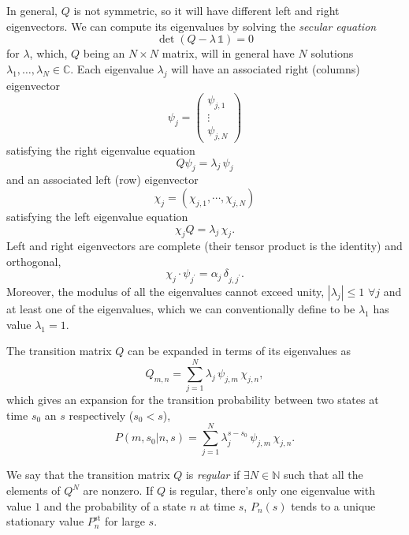 \documentclass[12pt]{article}
\numberwithin{equation}{section} %
\begin{document}
In general, $Q$ is not symmetric, so it will have different left and right eigenvectors. We can compute its eigenvalues by solving the \textit{secular equation}
\begin{equation}
\det\left( Q - \lambda\,\mathbb{1}\right) = 0
\end{equation}
for $\lambda$, which, $Q$ being an $N\times N$ matrix, will in general have $N$ solutions $\lambda_1, \ldots, \lambda_N \in\mathbb{C}$. Each eigenvalue $\lambda_j$ will have an associated right (columns) eigenvector
\begin{equation*}
\psi_j = \left(\begin{array}{c}
\psi_{j,1} \\
\vdots \\
\psi_{j,N}
\end{array}\right)
\end{equation*}
satisfying the right eigenvalue equation
\begin{equation}
Q \psi_j = \lambda_j\,\psi_j
\end{equation}
and an associated left (row) eigenvector
\begin{equation*}
\chi_j = \left( \chi_{j,1}, \cdots, \chi_{j,N}\right)
\end{equation*}
satisfying the left eigenvalue equation
\begin{equation}
\chi_j Q = \lambda_j\,\chi_j.
\end{equation}
Left and right eigenvectors are complete (their tensor product is the identity) and orthogonal,
\begin{equation}
\chi_j\cdot\psi_{j^\prime}  = \alpha_j\,\delta_{j, j^\prime}.
\end{equation}
Moreover, the modulus of all the eigenvalues cannot exceed unity, $|\lambda_j| \leq 1\,\, \forall j$ and at least one of the eigenvalues, which we can conventionally define to be $\lambda_1$ has value $\lambda_1=1$.

The transition matrix $Q$ can be expanded in terms of its eigenvalues as
\begin{equation}
Q_{m,n} = \sum_{j=1}^N \lambda_j\,\psi_{j,m}\,\chi_{j,n},
\end{equation}
which gives an expansion for the transition probability between two states at time $s_0$ an $s$ respectively ($s_0<s$),
\begin{equation}
P\left(m, s_0 | n, s \right) = \sum_{j=1}^N \lambda^{s-s_0}_j\,\psi_{j,m}\,\chi_{j,n}.
\end{equation}

We say that the transition matrix $Q$ is \textit{regular} if $\exists N\in\mathbb{N}$ such that all the elements of $Q^N$ are nonzero. If $Q$ is regular, there's only one eigenvalue with value $1$ and the probability of a state $n$ at time $s$, $P_n(s)$ tends to a unique stationary value $P_n^{\text{st}}$ for large $s$.
\end{document}

